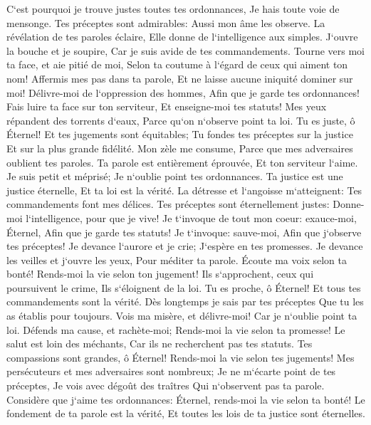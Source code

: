 \verse C`est pourquoi je trouve justes toutes tes ordonnances, Je hais toute voie de mensonge. 
\verse Tes préceptes sont admirables: Aussi mon âme les observe. 
\verse La révélation de tes paroles éclaire, Elle donne de l`intelligence aux simples. 
\verse J`ouvre la bouche et je soupire, Car je suis avide de tes commandements. 
\verse Tourne vers moi ta face, et aie pitié de moi, Selon ta coutume à l`égard de ceux qui aiment ton nom! 
\verse Affermis mes pas dans ta parole, Et ne laisse aucune iniquité dominer sur moi! 
\verse Délivre-moi de l`oppression des hommes, Afin que je garde tes ordonnances! 
\verse Fais luire ta face sur ton serviteur, Et enseigne-moi tes statuts! 
\verse Mes yeux répandent des torrents d`eaux, Parce qu`on n`observe point ta loi. 
\verse Tu es juste, ô Éternel! Et tes jugements sont équitables; 
\verse Tu fondes tes préceptes sur la justice Et sur la plus grande fidélité. 
\verse Mon zèle me consume, Parce que mes adversaires oublient tes paroles. 
\verse Ta parole est entièrement éprouvée, Et ton serviteur l`aime. 
\verse Je suis petit et méprisé; Je n`oublie point tes ordonnances. 
\verse Ta justice est une justice éternelle, Et ta loi est la vérité. 
\verse La détresse et l`angoisse m`atteignent: Tes commandements font mes délices. 
\verse Tes préceptes sont éternellement justes: Donne-moi l`intelligence, pour que je vive! 
\verse Je t`invoque de tout mon coeur: exauce-moi, Éternel, Afin que je garde tes statuts! 
\verse Je t`invoque: sauve-moi, Afin que j`observe tes préceptes! 
\verse Je devance l`aurore et je crie; J`espère en tes promesses. 
\verse Je devance les veilles et j`ouvre les yeux, Pour méditer ta parole. 
\verse Écoute ma voix selon ta bonté! Rends-moi la vie selon ton jugement! 
\verse Ils s`approchent, ceux qui poursuivent le crime, Ils s`éloignent de la loi. 
\verse Tu es proche, ô Éternel! Et tous tes commandements sont la vérité. 
\verse Dès longtemps je sais par tes préceptes Que tu les as établis pour toujours. 
\verse Vois ma misère, et délivre-moi! Car je n`oublie point ta loi. 
\verse Défends ma cause, et rachète-moi; Rends-moi la vie selon ta promesse! 
\verse Le salut est loin des méchants, Car ils ne recherchent pas tes statuts. 
\verse Tes compassions sont grandes, ô Éternel! Rends-moi la vie selon tes jugements! 
\verse Mes persécuteurs et mes adversaires sont nombreux; Je ne m`écarte point de tes préceptes, 
\verse Je vois avec dégoût des traîtres Qui n`observent pas ta parole. 
\verse Considère que j`aime tes ordonnances: Éternel, rends-moi la vie selon ta bonté! 
\verse Le fondement de ta parole est la vérité, Et toutes les lois de ta justice sont éternelles. 
